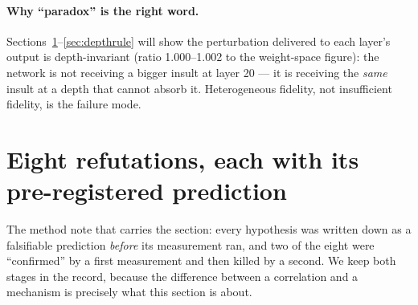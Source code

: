 \documentclass[10pt]{article} %
\begin{document}
\paragraph{Why ``paradox'' is the right word.} Sections~\ref{sec:refutations}--\ref{sec:depthrule} will show the perturbation
delivered to each layer's output is depth-invariant (ratio 1.000--1.002 to
the weight-space figure): the network is not receiving a bigger insult at
layer 20 --- it is receiving the \emph{same} insult at a depth that cannot absorb
it. Heterogeneous fidelity, not insufficient fidelity, is the failure mode.

\section{Eight refutations, each with its pre-registered prediction}
\label{sec:refutations}

The method note that carries the section: every hypothesis was written down as
a falsifiable prediction \emph{before} its measurement ran, and two of the eight
were ``confirmed'' by a first measurement and then killed by a second. We keep
both stages in the record, because the difference between a correlation and a
mechanism is precisely what this section is about.
\end{document}
